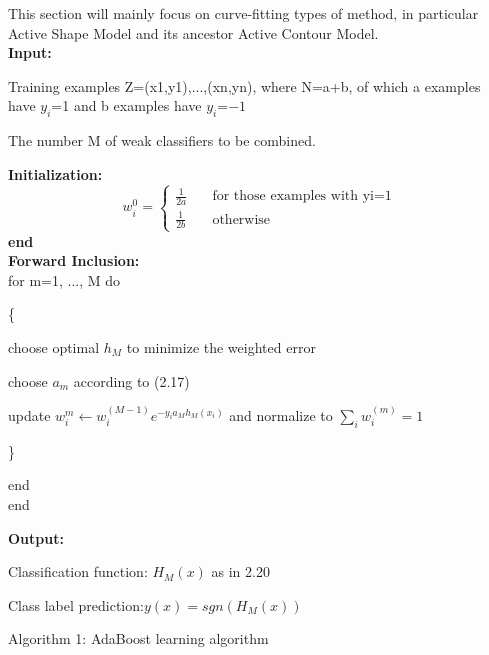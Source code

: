 \documentclass[12pt, twoside]{report}
\begin{document}
	\par
	This section will mainly focus on curve-fitting types of method, in particular Active Shape Model and its ancestor Active Contour Model. \\ 
	\textbf{Input:} \\
	\par Training examples Z={(x1,y1),...,(xn,yn)}, where N=a+b, of which a examples have $y_i$=1 and b examples have $y_i$=$-1$ \\
	\par The number M of weak classifiers to be combined.

	\textbf{Initialization:} \\
	\[
		w_i^{0}= \begin{cases}
			\frac{1}{2a}  & \quad \text{for those examples with yi=1} \\
			\frac{1}{2b}  & \quad \text{otherwise}
			\end{cases}
	\]
	\textbf{end}\\
	\textbf{Forward Inclusion:} \\

	for m=1, ..., M do \\
	\par \{
	\par choose optimal $h_M$ to minimize the weighted error \\
	\par choose $a_m$ according to (2.17) \\
	\par update $w_i^{m} \leftarrow w_i^{(M-1)}e^{-y_ia_Mh_M(x_i)}$ and normalize to $\displaystyle\sum_{i}w_i^{(m)}=1$  \\
	\par \}
	\par end \\
	end \\
	\par 
	\textbf{Output:} \\
	\par Classification function: $H_M(x)$ as in 2.20 \\
	\par Class label prediction:$y(x) = sgn(H_M(x))$

	\begin{center}
		Algorithm 1: AdaBoost learning algorithm \cite{35}
	\end{center}

	\newpage
	
\end{document}
